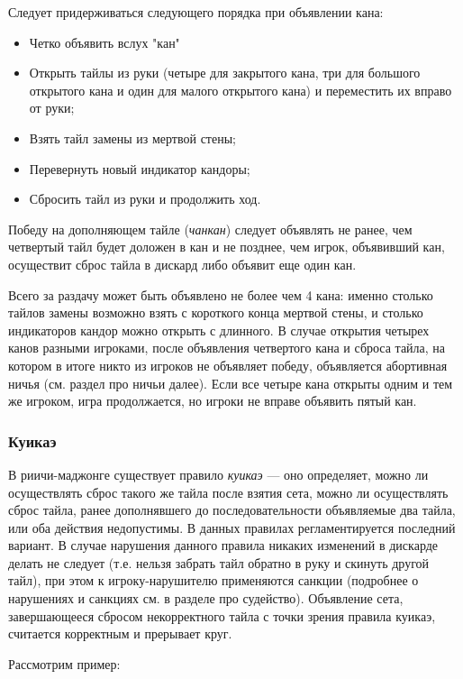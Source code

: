 Следует придерживаться следующего порядка при объявлении кана:
\begin{itemize}
	\item Четко объявить вслух "кан"
	\item Открыть тайлы из руки (четыре для закрытого кана, три для большого открытого кана и один для малого открытого кана) и переместить их вправо от руки;
	\item Взять тайл замены из мертвой стены;
	\item Перевернуть новый индикатор кандоры;
	\item Сбросить тайл из руки и продолжить ход.
\end{itemize}

Победу на дополняющем тайле (\textit{чанкан}) следует объявлять не ранее, чем четвертый тайл будет доложен в кан и не позднее, чем игрок, объявивший кан, осуществит сброс тайла в дискард либо объявит еще один кан.

Всего за раздачу может быть объявлено не более чем 4 кана: именно столько тайлов замены возможно взять с короткого конца мертвой стены, и столько индикаторов кандор можно открыть с длинного. В случае открытия четырех канов разными игроками, после объявления четвертого кана и сброса тайла, на котором в итоге никто из игроков не объявляет победу, объявляется абортивная ничья (см. раздел про ничьи далее). Если все четыре кана открыты одним и тем же игроком, игра продолжается, но игроки не вправе объявить пятый кан.

\subsubsection{Куикаэ}

В риичи-маджонге существует правило \textit{куикаэ} --- оно определяет, можно ли осуществлять сброс такого же тайла после взятия сета, можно ли осуществлять сброс тайла, ранее дополнявшего до последовательности объявляемые два тайла, или оба действия недопустимы. В данных правилах регламентируется последний вариант. В случае нарушения данного правила никаких изменений в дискарде делать не следует (т.е. нельзя забрать тайл обратно в руку и скинуть другой тайл), при этом к игроку-нарушителю применяются санкции (подробнее о нарушениях и санкциях см. в разделе про судейство). Объявление сета, завершающееся сбросом некорректного тайла с точки зрения правила куикаэ, считается корректным и прерывает круг.

Рассмотрим пример:

 \hfill {}

